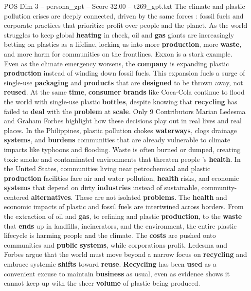 \begin{textsample}{POS Dim 3 – persona\_gpt – Score 32.00 – t269\_gpt.txt}  \label{ex:f3_pos_027}
The climate and plastic pollution crises are deeply connected, driven by the same forces : fossil fuels and corporate practices that prioritize profit over people and the planet.
As the world struggles to keep global \textbf{heating} in check, oil and \textbf{gas} giants are increasingly betting on plastics as a lifeline, locking us into more \textbf{production}, more \textbf{waste}, and more harm for communities on the frontlines.
Exxon is a stark example.
Even as the climate emergency worsens, the \textbf{company} is expanding plastic \textbf{production} instead of winding down fossil fuels.
This expansion fuels a surge of single-use \textbf{packaging} and \textbf{products} that are \textbf{designed} to be thrown away, not \textbf{reused}.
At the same \textbf{time}, \textbf{consumer} \textbf{brands} like Coca-Cola continue to flood the world with single-use plastic \textbf{bottles}, despite knowing that \textbf{recycling} has failed to \textbf{deal} with the \textbf{problem} at \textbf{scale}.
Only 9 %
Contributors Marian Ledesma and Graham Forbes highlight how these decisions play out in real lives and real places.
In the Philippines, plastic pollution chokes \textbf{waterways}, clogs drainage \textbf{systems}, and \textbf{burdens} communities that are already vulnerable to climate impacts like typhoons and flooding.
Waste is often burned or dumped, creating toxic smoke and contaminated environments that threaten people ’s \textbf{health}.
In the United States, communities living near petrochemical and plastic \textbf{production} facilities face air and water pollution, \textbf{health} risks, and economic \textbf{systems} that depend on dirty \textbf{industries} instead of sustainable, community-centered \textbf{alternatives}.
These are not isolated \textbf{problems}.
The \textbf{health} and economic impacts of plastic and fossil fuels are intertwined across borders.
From the extraction of oil and \textbf{gas}, to refining and plastic \textbf{production}, to the \textbf{waste} that \textbf{ends} up in landfills, incinerators, and the environment, the entire plastic lifecycle is harming people and the climate.
The \textbf{costs} are pushed onto communities and \textbf{public} \textbf{systems}, while corporations profit.
Ledesma and Forbes argue that the world must move beyond a narrow focus on \textbf{recycling} and embrace systemic \textbf{shifts} toward \textbf{reuse}. \textbf{Recycling} has been \textbf{used} as a convenient excuse to maintain \textbf{business} as usual, even as evidence shows it cannot keep up with the sheer \textbf{volume} of plastic being produced.

\end{textsample}
